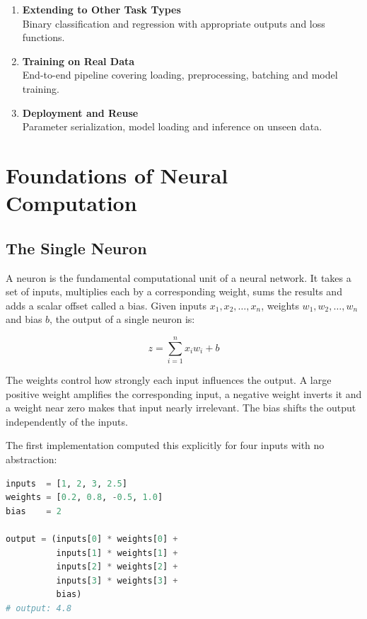 \documentclass[12pt,a4paper]{report}
\begin{document}
\begin{enumerate}[
    leftmargin=0pt,
    itemindent=1.5em,
    label=\textbf{\arabic*.},
    itemsep=0.75em,
    topsep=0.3em,
    parsep=0pt
]
\item \textbf{Extending to Other Task Types}\\
Binary classification and regression with appropriate outputs and loss functions.

\item \textbf{Training on Real Data}\\
End-to-end pipeline covering loading, preprocessing, batching and model training.

\item \textbf{Deployment and Reuse}\\
Parameter serialization, model loading and inference on unseen data.

\end{enumerate}

\endgroup

\clearpage

\chapter{Foundations of Neural Computation}

\section{The Single Neuron}

A neuron is the fundamental computational unit of a neural network. It takes a set of inputs,
multiplies each by a corresponding weight, sums the results and adds a scalar offset called a bias.
Given inputs $x_1, x_2, \ldots, x_n$, weights $w_1, w_2, \ldots, w_n$ and bias $b$,
the output of a single neuron is:

\begin{equation}
    z = \sum_{i=1}^{n} x_i w_i + b
\end{equation}

The weights control how strongly each input influences the output. A large positive weight
amplifies the corresponding input, a negative weight inverts it and a weight near zero makes
that input nearly irrelevant. The bias shifts the output independently of the inputs.

The first implementation computed this explicitly for four inputs with no abstraction:

\begin{lstlisting}[language=Python]
inputs  = [1, 2, 3, 2.5]
weights = [0.2, 0.8, -0.5, 1.0]
bias    = 2

output = (inputs[0] * weights[0] +
          inputs[1] * weights[1] +
          inputs[2] * weights[2] +
          inputs[3] * weights[3] +
          bias)
# output: 4.8
\end{lstlisting}
\end{document}
